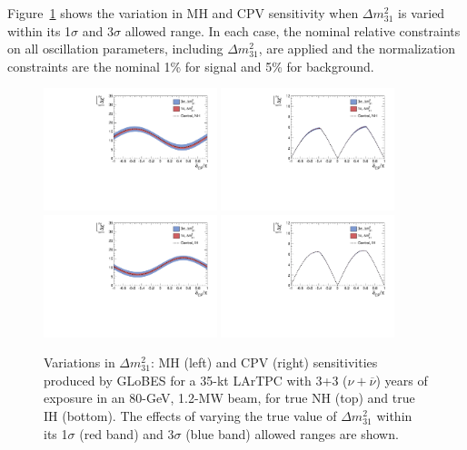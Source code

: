 \documentclass[letterpaper,11pt]{article}
\begin{document}
Figure~\ref{fig:dmsqsens} shows the variation in MH and CPV sensitivity when 
$\Delta m^2_{31}$
is varied within its 1$\sigma$ and 3$\sigma$ allowed range. In each case, the 
nominal relative constraints on all oscillation parameters, including $\Delta m^2_{31}$,
are applied and the normalization constraints are the nominal
1\% for signal and 5\% for background.
\begin{figure}[!htb]
  \centering
  \includegraphics[width=0.45\textwidth]{figs/mh_35kt_nh_dmsq.pdf}
  \includegraphics[width=0.45\textwidth]{figs/cpv_35kt_nh_dmsq.pdf}
  \includegraphics[width=0.45\textwidth]{figs/mh_35kt_ih_dmsq.pdf}
  \includegraphics[width=0.45\textwidth]{figs/cpv_35kt_ih_dmsq.pdf}
  \caption{
  Variations in $\Delta m^2_{31}$: 
  MH (left) and CPV (right) sensitivities 
  produced by GLoBES for a 35-kt LArTPC with 3+3 ($\nu + \overline{\nu}$) years of 
  exposure in an 80-GeV, 1.2-MW beam,  for true NH (top) and true IH (bottom). 
  The effects of varying the true
  value of $\Delta m^2_{31}$ within its 1$\sigma$ (red band) and 3$\sigma$ (blue band)
  allowed ranges are shown.} 
  \label{fig:dmsqsens}
\end{figure}
\end{document}
